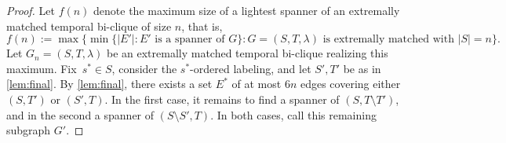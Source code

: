 \documentclass[10pt,a4paper]{amsart}
\begin{document}
\begin{proof}
Let $f(n)$ denote the maximum size of a lightest spanner of an extremally matched temporal bi-clique of size $n$, that is,
\begin{equation*}
f(n):=\max \{\min\{|E'|: E' \text{ is a spanner of } G\}: G=(S,T,\lambda) \text{ is extremally matched with } |S|=n\}.
\end{equation*}
Let $G_n=(S,T,\lambda)$ be an extremally matched temporal bi-clique realizing this maximum.
Fix~${s^*\in S}$, consider the $s^*$-ordered labeling, and let $S',T'$ be as in \cref{lem:final}.
By \cref{lem:final}, there exists a set $E^*$ of at most $6n$ edges covering either $(S,T')$ or $(S',T)$.
In the first case, it remains to find a spanner of $(S,T\setminus T')$, and in the second a spanner of $(S\setminus S',T)$.
In both cases, call this remaining subgraph $G'$.


\end{proof}
\end{document}
